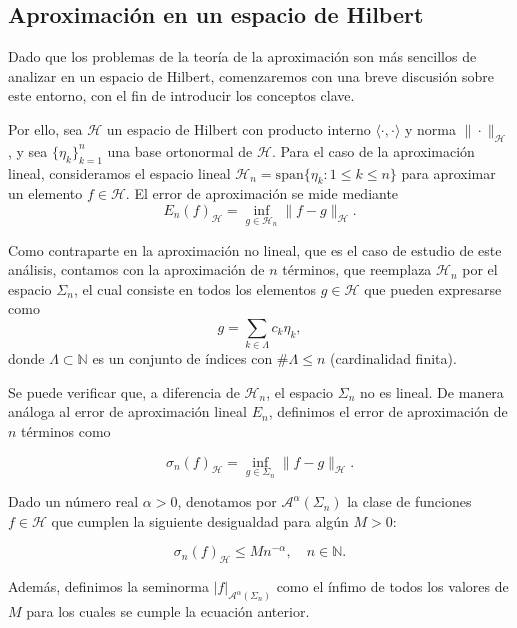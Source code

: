 \subsection{Aproximación en un espacio de Hilbert}

Dado que los problemas de la teoría de la aproximación son más sencillos de analizar en un espacio de Hilbert, comenzaremos con una breve discusión sobre este entorno, con el fin de introducir los conceptos clave.\newline

Por ello, sea $\mathcal{H}$ un espacio de Hilbert con producto interno $\langle \cdot, \cdot \rangle$ y norma $\|\cdot\|_{\mathcal{H}}$, y sea $\{\eta_k\}_{k=1}^{n}$ una base ortonormal de $\mathcal{H}$. Para el caso de la aproximación lineal, consideramos el espacio lineal $\mathcal{H}_n = \text{span}\{\eta_k : 1 \leq k \leq n\}$ para aproximar un elemento $f \in \mathcal{H}$. El error de aproximación se mide mediante
\[
    E_n(f)_{\mathcal{H}} = \inf_{g \in \mathcal{H}_n} \| f - g \|_{\mathcal{H}}.
\]

Como contraparte en la aproximación no lineal, que es el caso de estudio de este análisis, contamos con la aproximación de $n$ términos, que reemplaza $\mathcal{H}_n$ por el espacio $\Sigma_n$, el cual consiste en todos los elementos $g \in \mathcal{H}$ que pueden expresarse como
\[
    g = \sum_{k \in \Lambda} c_k \eta_k,
\]
donde $\Lambda \subset \mathbb{N}$ es un conjunto de índices con $\# \Lambda \leq n$ (cardinalidad finita).\newline

Se puede verificar que, a diferencia de $\mathcal{H}_n$, el espacio $\Sigma_n$ no es lineal. De manera análoga al error de aproximación lineal $E_n$, definimos el error de aproximación de $n$ términos como

\[
    \sigma_n(f)_{\mathcal{H}} = \inf_{g \in \Sigma_n} \| f - g \|_{\mathcal{H}}.
\]

\begin{definicion}
    Dado un número real $\alpha > 0$, denotamos por $\mathcal{A}^{\alpha}(\Sigma_n)$ la clase de funciones $f \in \mathcal{H}$ que cumplen la siguiente desigualdad para algún $M > 0$:

    \begin{equation}\label{eq:clases-error}
        \sigma_n(f)_{\mathcal{H}} \leq M n^{-\alpha}, \quad n \in \mathbb{N}.
    \end{equation}

    Además, definimos la seminorma $|f|_{\mathcal{A}^{\alpha}(\Sigma_n)}$ como el ínfimo de todos los valores de $M$ para los cuales se cumple la ecuación anterior.
\end{definicion}

